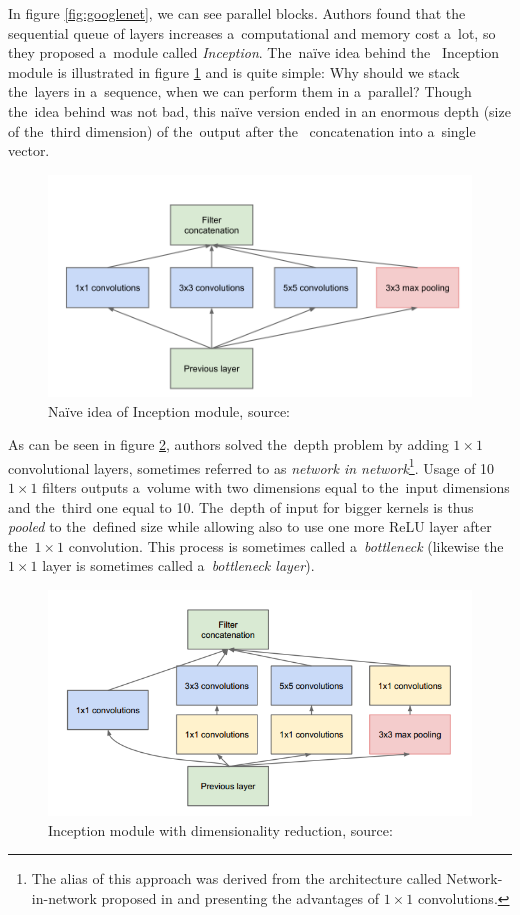 In figure \ref{fig:googlenet}, we can see parallel blocks. Authors found that 
the sequential queue of layers increases a~computational and memory cost a~lot,
so they proposed a~module called \textit{Inception}. The~naïve idea behind the~
Inception module is illustrated in figure \ref{fig:inception-naive} and is quite 
simple: Why should we stack the~layers in a~sequence, when we can perform them 
in a~parallel? Though the~idea behind was not bad, this naïve version ended in 
an enormous depth (size of the~third dimension) of the~output after the~
concatenation into a~single vector.

\begin{figure}[H]
   \centering
	\includegraphics[width=0.8\linewidth]{./pictures/inception-naive.png}
	\caption[Inception module, naïve idea]{Naïve idea of Inception module, source: 
\cite{googlenet}}
      \label{fig:inception-naive}
\end{figure}

As can be seen in figure \ref{fig:inception-full}, authors solved the~depth 
problem by adding $1 \times 1$ convolutional layers, sometimes referred to as 
\textit{network in network}\footnote{The alias of this approach was derived from 
the architecture called Network-in-network proposed in \cite{nin} and presenting 
the advantages of $1 \times 1$ convolutions.}. Usage of 10 $1 \times 1$ filters 
outputs a~volume with two dimensions equal to the~input dimensions and the~third 
one equal to 10. The~depth of input for bigger kernels is thus \textit{pooled} 
to the~defined size while allowing also to use one more ReLU layer after the~$1 
\times 1$ convolution. This process is sometimes called a~\textit{bottleneck} 
(likewise the~$1 \times 1$ layer is sometimes called a~\textit{bottleneck 
layer}).

\begin{figure}[H]
   \centering
	\includegraphics[width=0.8\linewidth]{./pictures/inception-full.png}
	\caption[Inception module, full]{Inception module with dimensionality 
reduction, source: \cite{googlenet}}
      \label{fig:inception-full}
\end{figure}

